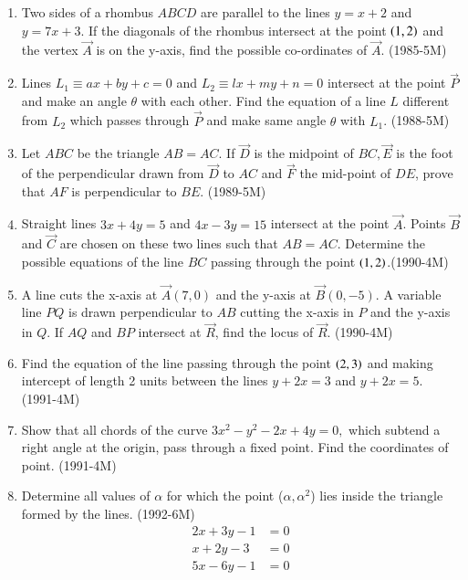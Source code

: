 \documentclass[journal,12pt,twocolumn]{IEEEtran}
\theoremstyle{remark}
\begin{document}
\begin{enumerate}[start=4]
\item Two sides of a rhombus $ABCD$ are parallel to the lines $y=x+2$ and $y=7x+3$. If the diagonals of the rhombus intersect at the point $\left(1,2\right)$ and the vertex $\vec{A}$ is on the y-axis, find the possible co-ordinates of $\vec{A}$.     \hfill{(1985-5M)} 

\item Lines $ L_1 \equiv ax+by+c =0 $ and $ L_2 \equiv lx+my+n =0 $ intersect at the point $\vec{P}$ and make an angle $\theta$ with each other. Find the equation of a line $L$ different from $L_2$ which passes through $\vec{P}$ and make same angle $\theta$ with $L_1$. \hfill{(1988-5M)}


\item Let $ABC$ be the triangle $AB=AC$. If $\vec{D}$ is the midpoint of $ BC, \vec{E}$ is the foot of the perpendicular drawn from $\vec{D}$ to $AC$ and $\vec{F}$ the mid-point of $DE$, prove that $AF$ is perpendicular to $BE.$ \hfill{(1989-5M)}

\item Straight lines $3x + 4y =5$ and $ 4x-3y= 15$ intersect at the point $\vec{A}$. Points $\vec{B}$ and $\vec{C}$ are chosen on these two lines such that $AB=AC$. Determine the possible equations of the line $BC$ passing through the point $\left(1,2\right)$.\hfill{(1990-4M)}

\item A line cuts the x-axis at $\vec{A}(7,0)$ and the y-axis at $\vec{B}(0,-5)$. A variable line $PQ$ is drawn perpendicular to $AB$ cutting the x-axis in $P$ and the y-axis in $Q$. If $AQ$ and $BP$ intersect at $\vec{R}$, find the locus of $\vec{R}$.  \hfill{(1990-4M)}

\item Find the equation of the line passing through the point $\left(2,3\right)$ and making intercept of length 2 units between the lines $ y + 2x = 3 $ and $ y + 2x = 5  $.     \hfill{(1991-4M)}

	\begin{center}

	\end{center}

\item Show that all chords of  the curve $ 3x^2-y^2-2x+4y=0,$ which subtend a right angle at the origin, pass through a fixed point. Find the coordinates of point.     \hfill{(1991-4M)}

\item Determine all values of $\alpha$ for which the point ($\alpha , \alpha^2$) lies inside the triangle formed by the lines.  \hfill{(1992-6M)}
	\begin{align*}  2x+3y-1&=0\\ 
	x+2y-3&=0  \\ 5x-6y-1&=0   \end{align*}

\end{enumerate}
\end{document}
